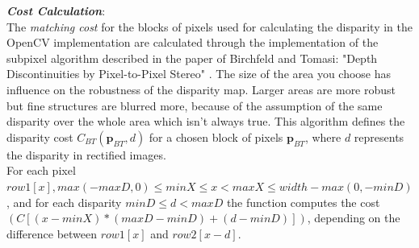 \documentclass[a4paper]{article}
\begin{document}
\emph{\textbf{Cost Calculation}}:\\
The \emph{matching cost} for the blocks of pixels used for calculating
the disparity in the OpenCV implementation are calculated through the
implementation of the subpixel algorithm described in the paper of
Birchfeld and Tomasi: "Depth Discontinuities by Pixel-to-Pixel Stereo"
\cite{birchtom99}. The size of the area you choose has influence on
the robustness of the disparity map. Larger areas are more robust but
fine structures are blurred more, because of the assumption of the
same disparity over the whole area which isn't always true.  This
algorithm defines the disparity cost $C_{BT}( \mathbf{p}_{BT},d)$ for
a chosen block of pixels $\mathbf{p}_{BT}$, where $d$ represents the
disparity in rectified images.\\

For each pixel $row1[x], max(-maxD, 0) \leq minX \leq x < maxX \leq
width - max(0, -minD)$, and for each disparity $minD \leq d < maxD$
the function computes the cost $(C[(x-minX)*(maxD - minD) + (d -
minD)])$, depending on the difference between $row1[x]$ and
$row2[x-d]$.\\
\end{document}
